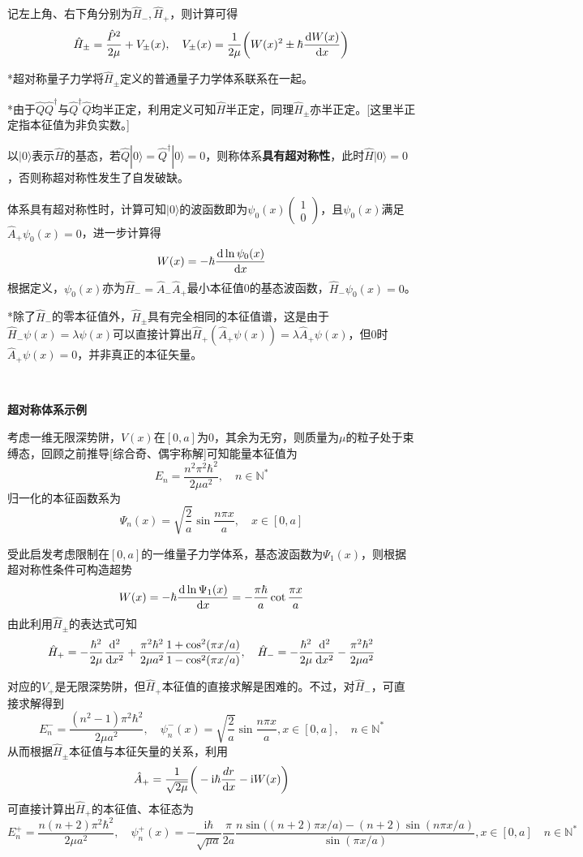 \documentclass[a4paper,UTF8,fontset=windows]{ctexart}
\newcommand*{\dr}{\hspace{0.07em}\mathrm{d}}
\newcommand*{\ir}{\mathrm{i}}
\newcommand*{\ket}[1]{|#1\rangle}
\begin{document}
记左上角、右下角分别为$\hat{H}_-,\hat{H}_+$，则计算可得
$$\hat{H}_\pm=\frac{\hat{P}^2}{2\mu}+V_\pm(x),\quad V_{\pm}(x)=\frac{1}{2\mu}\bigg(W(x)^2\pm\hbar\frac{\dr W(x)}{\dr x}\bigg)$$

*超对称量子力学将$\hat{H}_\pm$定义的普通量子力学体系联系在一起。

*由于$\hat{Q}\hat{Q}^\dagger$与$\hat{Q}^\dagger\hat{Q}$均半正定，利用定义可知$\hat{H}$半正定，同理$\hat{H}_\pm$亦半正定。[这里半正定指本征值为非负实数。]

以$\ket{0}$表示$\hat{H}$的基态，若$\hat{Q}\ket{0}=\hat{Q}^\dagger\ket{0}=0$，则称体系\textbf{具有超对称性}，此时$\hat{H}\ket{0}=0$，否则称超对称性发生了自发破缺。

体系具有超对称性时，计算可知$\ket{0}$的波函数即为$\psi_0(x)\begin{pmatrix}1\\0\end{pmatrix}$，且$\psi_0(x)$满足$\hat{A}_+\psi_0(x)=0$，进一步计算得
$$W(x)=-\hbar\frac{\dr\ln\psi_0(x)}{\dr x}$$
根据定义，$\psi_0(x)$亦为$\hat{H}_-=\hat{A}_-\hat{A}_+$最小本征值0的基态波函数，$\hat{H}_-\psi_0(x)=0$。

*除了$\hat{H}_-$的零本征值外，$\hat{H}_\pm$具有完全相同的本征值谱，这是由于$\hat{H}_-\psi(x)=\lambda\psi(x)$可以直接计算出$\hat{H}_+(\hat{A}_+\psi(x))=\lambda\hat{A}_+\psi(x)$，但0时$\hat{A}_+\psi(x)=0$，并非真正的本征矢量。

\

\textbf{超对称体系示例}

考虑一维无限深势阱，$V(x)$在$[0,a]$为0，其余为无穷，则质量为$\mu$的粒子处于束缚态，回顾之前推导[综合奇、偶宇称解]可知能量本征值为
$$E_n=\frac{n^2\pi^2\hbar^2}{2\mu a^2},\quad n\in\mathbb{N}^*$$
归一化的本征函数系为
$$\Psi_n(x)=\sqrt{\frac{2}{a}}\sin\frac{n\pi x}{a},\quad x\in[0,a]$$

受此启发考虑限制在$[0,a]$的一维量子力学体系，基态波函数为$\Psi_1(x)$，则根据超对称性条件可构造超势
$$W(x)=-\hbar\frac{\dr\ln\Psi_1(x)}{\dr x}=-\frac{\pi\hbar}{a}\cot\frac{\pi x}{a}$$
由此利用$\hat{H}_\pm$的表达式可知
$$\hat{H}_+=-\frac{\hbar^2}{2\mu}\frac{\dr^2}{\dr x^2}+\frac{\pi^2\hbar^2}{2\mu a^2}\frac{1+\cos^2(\pi x/a)}{1-\cos^2(\pi x/a)},\quad\hat{H}_-=-\frac{\hbar^2}{2\mu}\frac{\dr^2}{\dr x^2}-\frac{\pi^2\hbar^2}{2\mu a^2}$$

对应的$V_+$是无限深势阱，但$\hat{H}_+$本征值的直接求解是困难的。不过，对$\hat{H}_-$，可直接求解得到
$$E_n^-=\frac{(n^2-1)\pi^2\hbar^2}{2\mu a^2},\quad\psi_n^-(x)=\sqrt{\frac{2}{a}}\sin\frac{n\pi x}{a},x\in[0,a],\quad n\in\mathbb{N}^*$$
从而根据$\hat{H}_\pm$本征值与本征矢量的关系，利用
$$\hat{A}_+=\frac{1}{\sqrt{2\mu}}\bigg(-\ir\hbar\frac{dr}{\dr x}-\ir W(x)\bigg)$$
可直接计算出$\hat{H}_+$的本征值、本征态为
$$E_n^+=\frac{n(n+2)\pi^2\hbar^2}{2\mu a^2},\quad\psi_n^+(x)=-\frac{\ir\hbar}{\sqrt{\mu a}}\frac{\pi}{2a}\frac{n\sin\big((n+2)\pi x/a\big)-(n+2)\sin(n\pi x/a)}{\sin(\pi x/a)},x\in[0,a]\quad n\in\mathbb{N}^*$$
\end{document}
